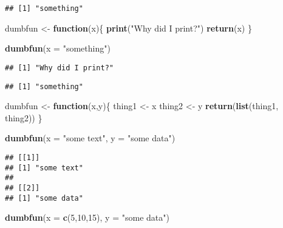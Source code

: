 \documentclass[
]{book}
\newenvironment{Shaded}{\begin{snugshade}}{\end{snugshade}}
\newcommand{\ControlFlowTok}[1]{\textcolor[rgb]{0.13,0.29,0.53}{\textbf{#1}}}
\newcommand{\DataTypeTok}[1]{\textcolor[rgb]{0.13,0.29,0.53}{#1}}
\newcommand{\DecValTok}[1]{\textcolor[rgb]{0.00,0.00,0.81}{#1}}
\newcommand{\KeywordTok}[1]{\textcolor[rgb]{0.13,0.29,0.53}{\textbf{#1}}}
\newcommand{\NormalTok}[1]{#1}
\newcommand{\StringTok}[1]{\textcolor[rgb]{0.31,0.60,0.02}{#1}}
\begin{document}
\begin{verbatim}
## [1] "something"
\end{verbatim}

\begin{Shaded}
\begin{Highlighting}[]
\NormalTok{dumbfun \textless{}{-}}\StringTok{ }\ControlFlowTok{function}\NormalTok{(x)\{}
  \KeywordTok{print}\NormalTok{(}\StringTok{"Why did I print?"}\NormalTok{)}
  \KeywordTok{return}\NormalTok{(x)}
\NormalTok{\}}

\KeywordTok{dumbfun}\NormalTok{(}\DataTypeTok{x =} \StringTok{"something"}\NormalTok{)}
\end{Highlighting}
\end{Shaded}

\begin{verbatim}
## [1] "Why did I print?"
\end{verbatim}

\begin{verbatim}
## [1] "something"
\end{verbatim}

\begin{Shaded}
\begin{Highlighting}[]
\NormalTok{dumbfun \textless{}{-}}\StringTok{ }\ControlFlowTok{function}\NormalTok{(x,y)\{}
\NormalTok{  thing1 \textless{}{-}}\StringTok{ }\NormalTok{x}
\NormalTok{  thing2 \textless{}{-}}\StringTok{ }\NormalTok{y}
  \KeywordTok{return}\NormalTok{(}\KeywordTok{list}\NormalTok{(thing1, thing2))}
\NormalTok{\}}

\KeywordTok{dumbfun}\NormalTok{(}\DataTypeTok{x =} \StringTok{"some text"}\NormalTok{, }\DataTypeTok{y =} \StringTok{"some data"}\NormalTok{)}
\end{Highlighting}
\end{Shaded}

\begin{verbatim}
## [[1]]
## [1] "some text"
## 
## [[2]]
## [1] "some data"
\end{verbatim}

\begin{Shaded}
\begin{Highlighting}[]
\KeywordTok{dumbfun}\NormalTok{(}\DataTypeTok{x =} \KeywordTok{c}\NormalTok{(}\DecValTok{5}\NormalTok{,}\DecValTok{10}\NormalTok{,}\DecValTok{15}\NormalTok{), }\DataTypeTok{y =} \StringTok{"some data"}\NormalTok{)}
\end{Highlighting}
\end{Shaded}
\end{document}
